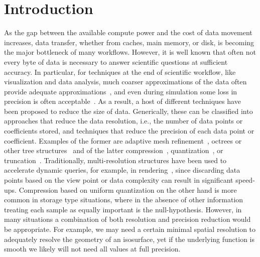 \section{Introduction}

As the gap between the available compute power and the cost of data
movement increases, data transfer, whether from caches, main memory,
or disk, is becoming the major bottleneck of many workflows. However,
it is well known that often not every byte of data is necessary to
answer scientific questions at sufficient accuracy.
In particular, for techniques at the end of scientific
workflow, like visualization and data analysis, much coarser
approximations of the data often provide adequate approximations~\cite{?},
               and even during simulation some loss in precision is often
               acceptable~\cite{compression_sim2013}. As a result, a host of different
               techniques have been proposed to reduce the size of data. Generically,
               these can be classified into approaches that reduce the data
               resolution, i.e., the number of data points or coefficients stored, and
               techniques that reduce the precision of each data point or coefficient.
               Examples of the former are
               adaptive mesh refinement~\cite{amr1989}, octrees or other tree
               structures~\cite{hierarchical1984} and of the latter compression~\cite{zfp2014},
               quantization~\cite{?}, or truncation~\cite{?}.
               Traditionally,
               multi-resolution structures have been used to accelerate dynamic
               queries, for example, in rendering~\cite{multires_octree1999}, since discarding data points
               based on the view point or data complexity can result in significant
               speed-ups. Compression based on uniform quantization on the other hand is
               more common in storage type situations, where in the absence of other
               information treating each sample as equally important is the
               null-hypothesis. However, in many situations a combination of both
               resolution and precision reduction would be appropriate.
               For example, we may need a certain minimal
               spatial resolution to adequately resolve the geometry of an isosurface,
               yet if the underlying function is smooth we likely will not need all values
               at full precision.
